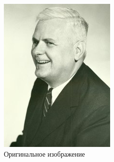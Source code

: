 \documentclass[10pt,a4paper,final]{article} %
\begin{document}
\begin{figure}[h!]
	\centering
	\begin{minipage}{0.3\textwidth}
		\centering
		\includegraphics[width=\linewidth]{img/Alonzo_Church}
		\caption{Оригинальное изображение}
	\end{minipage}
	\hspace{0.02\textwidth}
	\begin{minipage}{0.3\textwidth}
		\centering

\end{minipage}
\end{figure}
\end{document}

